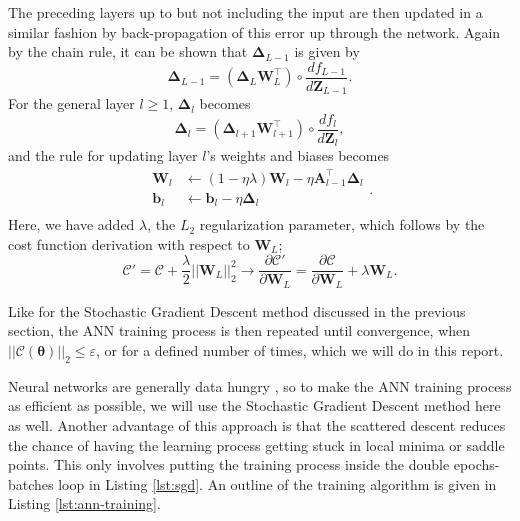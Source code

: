 \documentclass[]{article}
\begin{document}
The preceding layers up to but not including the input are then updated in a similar fashion by back-propagation of this error up through the network. Again by the chain rule, it can be shown that $\mathbf{\Delta}_{L-1}$ is given by
\begin{equation}
	\mathbf{\Delta}_{L-1} = (\mathbf{\Delta}_L \mathbf{W}_L^\intercal) \circ \frac{df_{L-1}}{d\mathbf{Z}_{L-1}}.
\end{equation}
For the general layer $l \ge 1$, $\mathbf{\Delta}_l$ becomes
\begin{equation} \label{update-deltas}
	\mathbf{\Delta}_{l} = (\mathbf{\Delta}_{l+1} \mathbf{W}_{l+1}^\intercal) \circ \frac{df_l}{d\mathbf{Z}_l},
\end{equation}
and the rule for updating layer $l$'s weights and biases becomes
\begin{equation} \label{update-weights-biases}
\begin{aligned}
	\mathbf{W}_l &\leftarrow (1 - \eta \lambda) \mathbf{W}_l - \eta \mathbf{A}_{l-1}^\intercal \mathbf{\Delta}_l \\
	\mathbf{b}_l &\leftarrow \mathbf{b}_l - \eta \mathbf{\Delta}_l \\
\end{aligned}.
\end{equation}
Here, we have added $\lambda$, the $L_2$ regularization parameter, which follows by the cost function derivation with respect to $\mathbf{W}_L$;
\begin{equation}
	\mathcal{C}' = \mathcal{C} + \frac{\lambda}{2} ||\mathbf{W}_L||_2^2 \rightarrow \frac{\partial \mathcal{C}'}{\partial \mathbf{W}_L} = \frac{\partial \mathcal{C}}{\partial \mathbf{W}_L} + \lambda \mathbf{W}_L.
\end{equation}

\vspace{5mm}

Like for the Stochastic Gradient Descent method discussed in the previous section, the ANN training process is then repeated until convergence, when $||\mathcal{C}(\mathbf{\theta})||_2 \le \varepsilon$, or for a defined number of times, which we will do in this report.

\vspace{5mm}

Neural networks are generally data hungry \cite{fys-stk4155-notes}, so to make the ANN training process as efficient as possible, we will use the Stochastic Gradient Descent method here as well. Another advantage of this approach is that the scattered descent reduces the chance of having the learning process getting stuck in local minima or saddle points. This only involves putting the training process inside the double epochs-batches loop in Listing \ref{lst:sgd}. An outline of the training algorithm is given in Listing \ref{lst:ann-training}.
\end{document}
